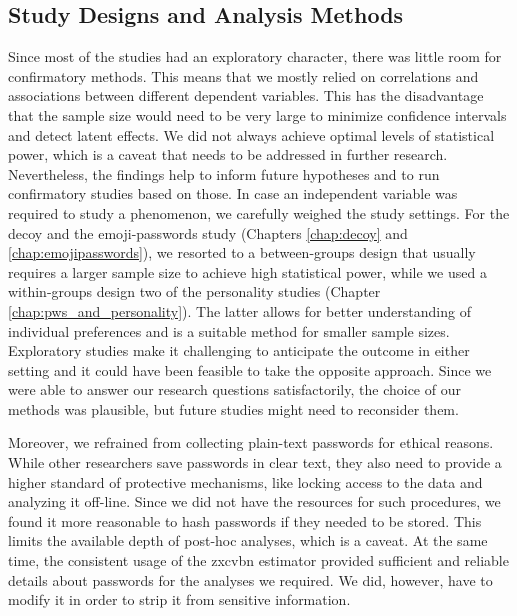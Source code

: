 

\subsection{Study Designs and Analysis Methods}
Since most of the studies had an exploratory character, there was little room for confirmatory methods. This means that we mostly relied on correlations and associations between different dependent variables. This has the disadvantage that the sample size would need to be very large to minimize confidence intervals and detect latent effects. We did not always achieve optimal levels of statistical power, which is a caveat that needs to be addressed in further research. Nevertheless, the findings help to inform future hypotheses and to run confirmatory studies based on those. 
In case an independent variable was required to study a phenomenon, we carefully weighed the study settings. For the decoy and the emoji-passwords study (Chapters \ref{chap:decoy} and \ref{chap:emojipasswords}), we resorted to a between-groups design that usually requires a larger sample size to achieve high statistical power, while we used a within-groups design two of the personality studies (Chapter \ref{chap:pws_and_personality}). The latter allows for better understanding of individual preferences and is a suitable method for smaller sample sizes. Exploratory studies make it challenging to anticipate the outcome in either setting and it could have been feasible to take the opposite approach. Since we were able to answer our research questions satisfactorily, the choice of our methods was plausible, but future studies might need to reconsider them. 

Moreover, we refrained from collecting plain-text passwords for ethical reasons. While other researchers save passwords in clear text, they also need to provide a higher standard of protective mechanisms, like locking access to the data and analyzing it off-line. Since we did not have the resources for such procedures, we found it more reasonable to hash passwords if they needed to be stored. This limits the available depth of post-hoc analyses, which is a caveat. At the same time, the consistent usage of the zxcvbn estimator provided sufficient and reliable details about passwords for the analyses we required. We did, however, have to modify it in order to strip it from sensitive information. 

